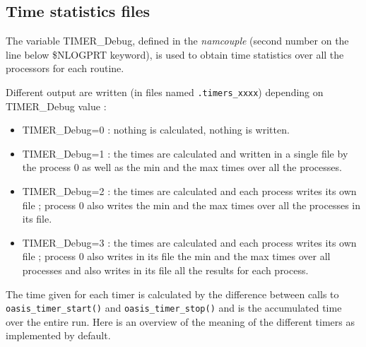 \subsection{Time statistics files}
\label{timestat}

The variable TIMER\_Debug, defined in the {\it namcouple} (second
number on the line below \$NLOGPRT keyword), is used to obtain time
statistics over all the processors for each routine.

Different output are written (in files named {\tt *.timers\_xxxx})
depending on TIMER\_Debug value :

\begin{itemize}
\item {TIMER\_Debug=0} : nothing is calculated, nothing is written.
\item {TIMER\_Debug=1} : the times are calculated and written in a
  single file by the process 0 as well as the min and the max times
  over all the processes.
\item {TIMER\_Debug=2} : the times are calculated and each process
  writes its own file ; process 0 also writes the min and the max
  times over all the processes in its file.
\item {TIMER\_Debug=3} : the times are calculated and each process
  writes its own file ; process 0 also writes in its file the min
  and the max times over all processes and also writes in its file
  all the results for each process.
\end{itemize}

The time given for each timer is calculated by the difference between
calls to {\tt oasis\_timer\_start()} and {\tt oasis\_timer\_stop()}
and is the accumulated time over the entire run. Here is an overview
of the meaning of the different timers as implemented by default.

